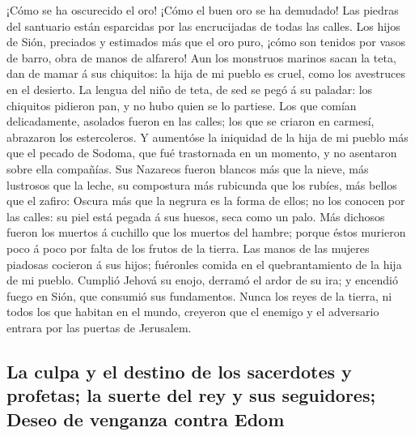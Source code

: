 ¡Cómo se ha oscurecido el oro! ¡Cómo el buen oro se ha
demudado! Las piedras del santuario están esparcidas por las
encrucijadas de todas las calles.  Los hijos de Sión,
preciados y estimados más que el oro puro, ¡cómo son tenidos por vasos
de barro, obra de manos de alfarero!  Aun los monstruos
marinos sacan la teta, dan de mamar á sus chiquitos: la hija de mi
pueblo es cruel, como los avestruces en el desierto.  La
lengua del niño de teta, de sed se pegó á su paladar: los chiquitos
pidieron pan, y no hubo quien se lo partiese.  Los que
comían delicadamente, asolados fueron en las calles; los que se criaron
en carmesí, abrazaron los estercoleros.  Y aumentóse la
iniquidad de la hija de mi pueblo más que el pecado de Sodoma, que fué
trastornada en un momento, y no asentaron sobre ella compañías.
 Sus Nazareos fueron blancos más que la nieve, más
lustrosos que la leche, su compostura más rubicunda que los rubíes, más
bellos que el zafiro:  Oscura más que la negrura es la
forma de ellos; no los conocen por las calles: su piel está pegada á sus
huesos, seca como un palo.  Más dichosos fueron los
muertos á cuchillo que los muertos del hambre; porque éstos murieron
poco á poco por falta de los frutos de la tierra.  Las
manos de las mujeres piadosas cocieron á sus hijos; fuéronles comida en
el quebrantamiento de la hija de mi pueblo.  Cumplió
Jehová su enojo, derramó el ardor de su ira; y encendió fuego en Sión,
que consumió sus fundamentos.  Nunca los reyes de la
tierra, ni todos los que habitan en el mundo, creyeron que el enemigo y
el adversario entrara por las puertas de Jerusalem.

\hypertarget{la-culpa-y-el-destino-de-los-sacerdotes-y-profetas-la-suerte-del-rey-y-sus-seguidores-deseo-de-venganza-contra-edom}{%
\subsection{La culpa y el destino de los sacerdotes y profetas; la
suerte del rey y sus seguidores; Deseo de venganza contra
Edom}\label{la-culpa-y-el-destino-de-los-sacerdotes-y-profetas-la-suerte-del-rey-y-sus-seguidores-deseo-de-venganza-contra-edom}}

